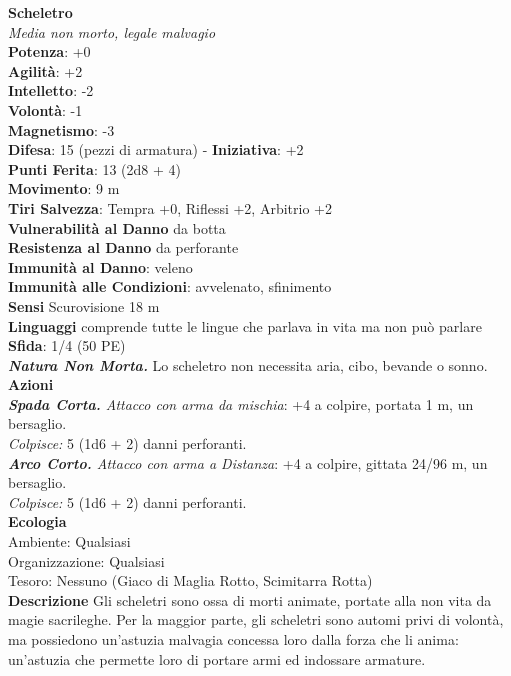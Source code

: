 \begin{multicols}{2}
\medskip\textbf{Scheletro}\\
\emph{Media non morto, legale malvagio}\\
\textbf{Potenza}: +0\\
\textbf{Agilità}: +2\\
\textbf{Intelletto}: -2\\
\textbf{Volontà}: -1\\
\textbf{Magnetismo}: -3\\
\textbf{Difesa}: 15 (pezzi di armatura) - \textbf{Iniziativa}: +2\\
\textbf{Punti Ferita}: 13 (2d8 + 4)\\
\textbf{Movimento}: 9 m\\
\textbf{Tiri Salvezza}: Tempra +0, Riflessi +2, Arbitrio +2\\
\textbf{Vulnerabilità al Danno} da botta\\
\textbf{Resistenza al Danno} da perforante\\
\textbf{Immunità al Danno}: veleno\\
\textbf{Immunità alle Condizioni}: avvelenato, sfinimento\\
\textbf{Sensi} Scurovisione 18 m\\
\textbf{Linguaggi} comprende tutte le lingue che parlava in vita ma non può parlare\\
\textbf{Sfida}: 1/4 (50 PE)\smallskip\\
\emph{\textbf{Natura Non Morta.}} Lo scheletro non necessita aria, cibo, bevande o sonno.\\
\smallskip\textbf{Azioni}\\
\emph{\textbf{Spada Corta.} Attacco con arma da mischia}: +4 a colpire, portata 1 m, un bersaglio.\\
\emph{Colpisce:} 5 (1d6 + 2) danni perforanti.\\
\emph{\textbf{Arco Corto.} Attacco con arma a Distanza}: +4 a colpire, gittata 24/96 m, un bersaglio.\\
\emph{Colpisce:} 5 (1d6 + 2) danni perforanti.\\
\textbf{Ecologia}\\
Ambiente: Qualsiasi\\
Organizzazione: Qualsiasi\\
Tesoro: Nessuno (Giaco di Maglia Rotto, Scimitarra Rotta)\\
\textbf{Descrizione}
Gli scheletri sono ossa di morti animate, portate alla non vita da magie sacrileghe. Per la maggior parte, gli scheletri sono automi privi di volontà, ma possiedono un’astuzia malvagia concessa loro dalla forza che li anima: un’astuzia che permette loro di portare armi ed indossare armature.\\



\end{multicols}
